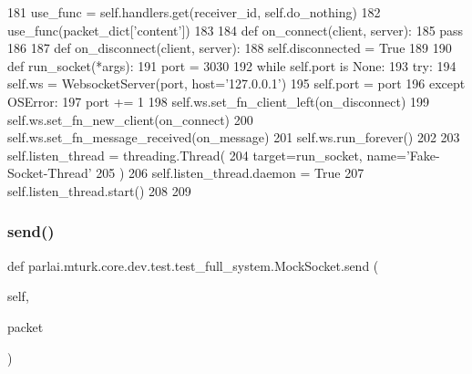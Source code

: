 \begin{DoxyCode}
181                 use\_func = self.handlers.get(receiver\_id, self.do\_nothing)
182                 use\_func(packet\_dict[\textcolor{stringliteral}{'content'}])
183 
184         \textcolor{keyword}{def }on\_connect(client, server):
185             \textcolor{keywordflow}{pass}
186 
187         \textcolor{keyword}{def }on\_disconnect(client, server):
188             self.disconnected = \textcolor{keyword}{True}
189 
190         \textcolor{keyword}{def }run\_socket(*args):
191             port = 3030
192             \textcolor{keywordflow}{while} self.port \textcolor{keywordflow}{is} \textcolor{keywordtype}{None}:
193                 \textcolor{keywordflow}{try}:
194                     self.ws = WebsocketServer(port, host=\textcolor{stringliteral}{'127.0.0.1'})
195                     self.port = port
196                 \textcolor{keywordflow}{except} OSError:
197                     port += 1
198             self.ws.set\_fn\_client\_left(on\_disconnect)
199             self.ws.set\_fn\_new\_client(on\_connect)
200             self.ws.set\_fn\_message\_received(on\_message)
201             self.ws.run\_forever()
202 
203         self.listen\_thread = threading.Thread(
204             target=run\_socket, name=\textcolor{stringliteral}{'Fake-Socket-Thread'}
205         )
206         self.listen\_thread.daemon = \textcolor{keyword}{True}
207         self.listen\_thread.start()
208 
209 
\end{DoxyCode}
\mbox{\label{classparlai_1_1mturk_1_1core_1_1dev_1_1test_1_1test__full__system_1_1MockSocket_a76c6347ad0156076cfc74a935821ce78}} 
\subsubsection{\texorpdfstring{send()}{send()}}
{\footnotesize\ttfamily def parlai.\+mturk.\+core.\+dev.\+test.\+test\+\_\+full\+\_\+system.\+Mock\+Socket.\+send (\begin{DoxyParamCaption}\item[{}]{self,  }\item[{}]{packet }\end{DoxyParamCaption})}



